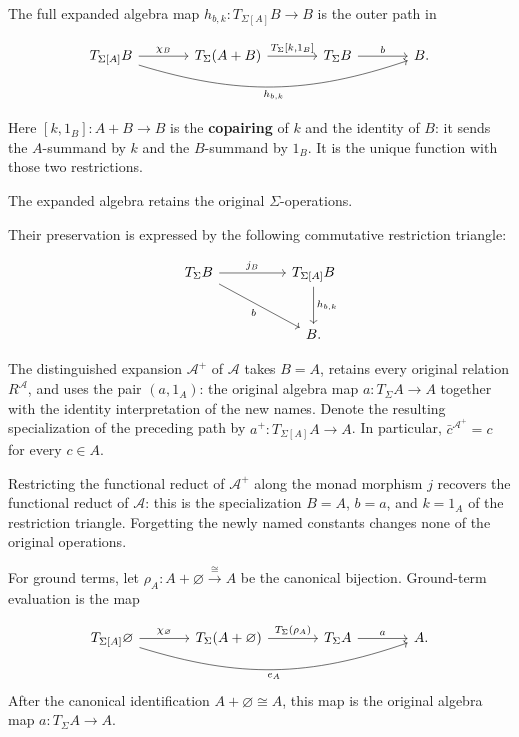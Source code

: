 \documentclass[11pt]{article}
\begin{document}
The full expanded algebra map \(h_{b,k}:T_{\Sigma[A]}B\to B\) is the outer
path in

\[
\begin{tikzcd}[column sep=large]
T_{\Sigma[A]}B \arrow[r,"\chi_B"]
  \arrow[rrr,bend right=18,"{h_{b,k}}"'] &
T_\Sigma(A+B) \arrow[r,"{T_\Sigma[k,1_B]}"] &
T_\Sigma B \arrow[r,"b"] & B.
\end{tikzcd}
\]

Here \([k,1_B]:A+B\to B\) is the \textbf{copairing} of \(k\) and the
identity of \(B\): it sends the \(A\)-summand by \(k\) and the
\(B\)-summand by \(1_B\). It is the unique function with those two
restrictions.

The expanded algebra retains the original \(\Sigma\)-operations.

Their preservation is expressed by the following commutative restriction
triangle:

\[
\begin{tikzcd}[row sep=large,column sep=huge]
T_\Sigma B \arrow[r,"j_B"] \arrow[dr,"b"'] &
T_{\Sigma[A]}B \arrow[d,"{h_{b,k}}"] \\
& B.
\end{tikzcd}
\]

The distinguished expansion \(\mathcal A^+\) of \(\mathcal A\) takes
\(B=A\), retains every original relation \(R^{\mathcal A}\), and uses the pair
\((a,1_A)\): the original algebra map \(a:T_\Sigma A\to A\) together with the
identity interpretation of the new names. Denote the resulting specialization
of the preceding path by \(a^+:T_{\Sigma[A]}A\to A\).
In particular, \(\bar c^{\mathcal A^+}=c\) for every \(c\in A\).

Restricting the functional reduct of \(\mathcal A^+\) along the monad
morphism \(j\) recovers the functional reduct of \(\mathcal A\):
this is the specialization \(B=A\), \(b=a\), and \(k=1_A\) of the restriction
triangle. Forgetting the newly named constants changes none of the original
operations.

For ground terms, let \(\rho_A:A+\varnothing\xrightarrow{\cong}A\) be the
canonical bijection. Ground-term evaluation is the map

\[
\begin{tikzcd}[column sep=large]
T_{\Sigma[A]}\varnothing \arrow[r,"\chi_\varnothing"]
  \arrow[rrr,bend right=18,"e_A"'] &
T_\Sigma(A+\varnothing) \arrow[r,"T_\Sigma(\rho_A)"] &
T_\Sigma A \arrow[r,"a"] & A.
\end{tikzcd}
\]
After the canonical identification \(A+\varnothing\cong A\), this map is the
original algebra map \(a:T_\Sigma A\to A\).
\end{document}
